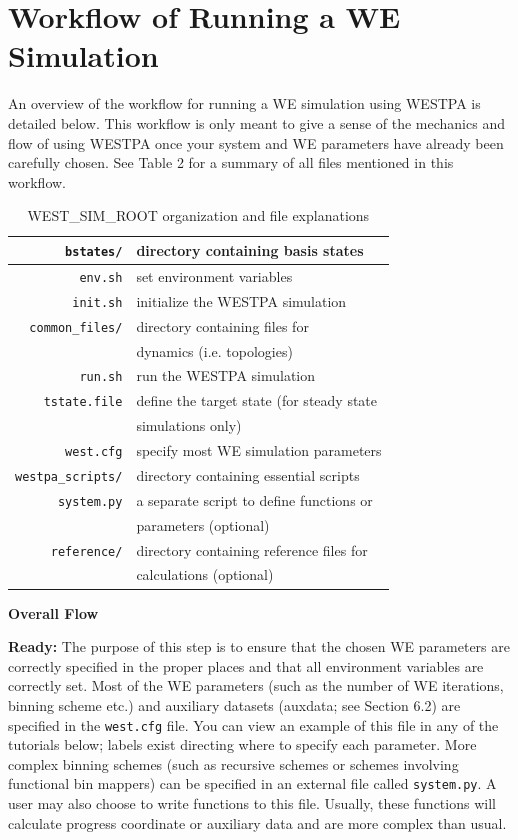 \documentclass[9pt,tutorial]{livecoms}
\begin{document}
\section{Workflow of Running a WE Simulation}

An overview of the workflow for running a WE simulation using WESTPA is detailed below. 
This workflow is only meant to give a sense of the mechanics and flow of using WESTPA once your system and WE parameters have already been carefully chosen. See Table 2 for a summary of all files mentioned in this workflow.

\begin{table}
\caption{WEST\_SIM\_ROOT organization and file explanations}
\centering
\begin{tabular}{| r | l |}
\hline
\verb|bstates/| & directory containing basis states \\
\hline
\verb|env.sh| & set environment variables \\
\hline
\verb|init.sh| & initialize the WESTPA simulation \\
\hline
\verb|common_files/| & directory containing files for \\
{} & dynamics (i.e. topologies) \\
\hline
\verb|run.sh| & run the WESTPA simulation \\
\hline
\verb|tstate.file| & define the target state (for steady state \\
{} & simulations only) \\
\hline
\verb|west.cfg| & specify most WE simulation parameters \\
\hline
\verb|westpa_scripts/| & directory containing essential scripts \\
\hline
\verb|system.py| & a separate script to define functions or \\
{} & parameters (optional) \\
\hline
\verb|reference/| & directory containing reference files for \\
{} & calculations (optional) \\
\hline
\end{tabular}
\end{table}

\textbf{Overall Flow}

\textbf{Ready:} The purpose of this step is to ensure that the chosen WE parameters are correctly specified in the proper places and that all environment variables are correctly set. 
Most of the WE parameters (such as the number of WE iterations, binning scheme etc.) and auxiliary datasets (auxdata; see Section 6.2) are specified in the \verb|west.cfg| file. 
You can view an example of this file in any of the tutorials below; labels exist directing where to specify each parameter. 
More complex binning schemes (such as recursive schemes or schemes involving functional bin mappers) can be specified in an external file called \verb|system.py|. 
A user may also choose to write functions to this file. 
Usually, these functions will calculate progress coordinate or auxiliary data and are more complex than usual.
\end{document}
